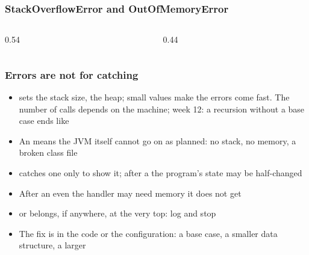 \documentclass[aspectratio=169,10pt,compress]{beamer}
\begin{document}




\begin{frame}[t,fragile] \frametitle{StackOverflowError and OutOfMemoryError}
	\begin{columns}[T]
		\begin{column}{0.54\textwidth}
		\end{column}
		\begin{column}{0.44\textwidth}
		\end{column}
	\end{columns}
\end{frame}




\begin{frame}[t,fragile] \frametitle{Errors are not for catching}
	\begin{itemize}\small
		\item {} sets the stack size,  the heap; small values make the errors come fast. The number of calls
			  depends on the machine; week 12: a recursion without a base case ends like 
		\item An  means the JVM itself cannot go on as planned: no stack, no memory, a broken class file
		\item {} catches one only to show it; after a  the program's state may be half-changed
		\item After an  even the handler may need memory it does not get
		\item {} or  belongs, if anywhere, at the very top: log and stop
		\item The fix is in the code or the configuration: a base case, a smaller data structure, a larger 
	\end{itemize}
\end{frame}
\end{document}
